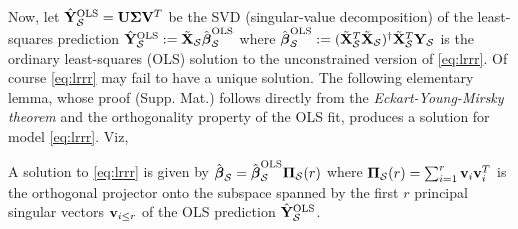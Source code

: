 Now, let $\hat{\mathbf{Y}}_{\mathcal S}^{\text{OLS}} = \mathbf{U} \boldsymbol{\Sigma} \mathbf{V}^T$ be the SVD
(singular-value decomposition) of the least-squares prediction
$\hat{\mathbf{Y}}_{\mathcal S}^{\text{OLS}} := \tilde{\mathbf{X}}_{\mathcal S}\hat{\boldsymbol{\beta}}_{\mathcal S}^{\text{OLS}}$ where
$\hat{\boldsymbol{\beta}}_{\mathcal S}^{\text{OLS}} := (\tilde{\mathbf{X}}_{\mathcal S}^T\tilde{\mathbf{X}}_{\mathcal S})^\dagger\tilde{\mathbf{X}}_{\mathcal S}^T\mathbf{Y}_{\mathcal S}$
is the ordinary least-squares (OLS) solution to the unconstrained version of \eqref{eq:lrrr}.
Of course \eqref{eq:lrrr} may fail to have a unique solution. The following elementary lemma,
whose proof  (Supp. Mat.) follows directly from the \textit{Eckart-Young-Mirsky theorem}\citep{eckart2000}
and the orthogonality property of the OLS fit, produces a solution for model \eqref{eq:lrrr}. Viz,
\begin{lemma}
   A solution to \eqref{eq:lrrr} is given by
$\hat{\boldsymbol{\beta}}_{\mathcal S} = \hat{\boldsymbol{\beta}}_{\mathcal S}^{\text{OLS}}\boldsymbol{\Pi}_{\mathcal S}(r)$
  where $\boldsymbol{\Pi}_{\mathcal S}(r) = \sum_{i=1}^{r}\mathbf{v}_i\mathbf{v}_i^T$ is the orthogonal
  projector onto the subspace spanned by the first $r$ principal singular vectors $\mathbf{v}_{i \le r}$
  of the OLS prediction $\hat{\mathbf{Y}}_{\mathcal S}^{\text{OLS}}$.
  \label{thm:eym}
\end{lemma}

